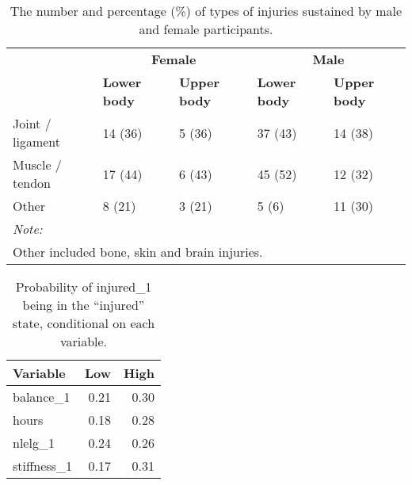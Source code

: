 \documentclass[
]{frontiersHLTH}
\begin{document}
\begin{table}[H]

\caption{\label{tab:table4}The number and percentage (\%) of types of injuries sustained by male and female participants.}
\centering
\begin{tabular}[t]{l|l|l|l|l}
\hline
\multicolumn{1}{c|}{\textbf{ }} & \multicolumn{2}{c|}{\textbf{Female}} & \multicolumn{2}{c}{\textbf{Male}} \\
\cline{2-3} \cline{4-5}
\textbf{} & \textbf{Lower body} & \textbf{Upper body} & \textbf{Lower body} & \textbf{Upper body}\\
\hline
Joint / ligament & 14 (36) & 5 (36) & 37 (43) & 14 (38)\\
\hline
Muscle / tendon & 17 (44) & 6 (43) & 45 (52) & 12 (32)\\
\hline
Other & 8 (21) & 3 (21) & 5 (6) & 11 (30)\\
\hline
\multicolumn{5}{l}{\textit{Note: }}\\
\multicolumn{5}{l}{Other included bone, skin and brain injuries.}\\
\end{tabular}
\end{table}

\begin{table}[H]

\caption{\label{tab:table5}Probability of injured\_1 being in the ``injured'' state, conditional on each variable.}
\centering
\begin{tabular}[t]{l|r|r}
\hline
\textbf{Variable} & \textbf{Low} & \textbf{High}\\
\hline
balance\_1 & 0.21 & 0.30\\
\hline
hours & 0.18 & 0.28\\
\hline
nlelg\_1 & 0.24 & 0.26\\
\hline
stiffness\_1 & 0.17 & 0.31\\
\hline
\end{tabular}
\end{table}
\end{document}
